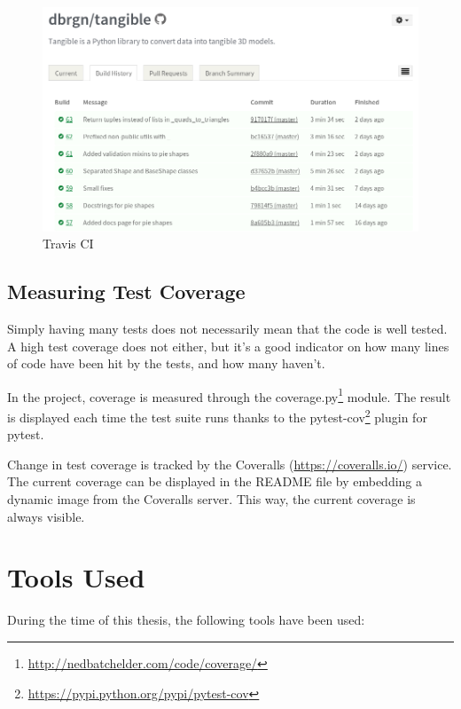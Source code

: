 \begin{figure}[H]
	\centering
	\includegraphics[width=\textwidth]{images/travis.png}
	\caption{Travis CI}
	\label{img:travis}
\end{figure}

\subsection{Measuring Test Coverage}

Simply having many tests does not necessarily mean that the code is well tested.
A high test coverage does not either, but it's a good indicator on how many
lines of code have been hit by the tests, and how many haven't.

In the \tangible{} project, coverage is measured through the
coverage.py\footnote{\url{http://nedbatchelder.com/code/coverage/}} module. The
result is displayed each time the test suite runs thanks to the
pytest-cov\footnote{\url{https://pypi.python.org/pypi/pytest-cov}} plugin for
pytest.

Change in test coverage is tracked by the Coveralls
(\url{https://coveralls.io/}) service. The current coverage can be displayed in
the README file by embedding a dynamic image from the Coveralls server. This
way, the current coverage is always visible.


\section{Tools Used}

During the time of this thesis, the following tools have been used:

